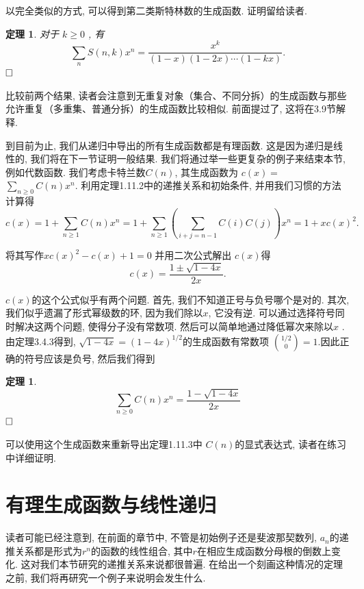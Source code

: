 \documentclass[a4paper,12pt]{ctexbook}
\newtheorem{theorem}[lemma]{\hspace{2em}定理}%
\begin{document}
以完全类似的方式, 可以得到第二类斯特林数的生成函数. 证明留给读者.
\begin{theorem}
对于 $k \geq 0$ , 有
$$
\sum_{n} S(n, k) x^{n}=\frac{x^{k}}{(1-x)(1-2 x) \cdots(1-k x)}.
$$ $\hfill\square$
\end{theorem}

比较前两个结果, 读者会注意到无重复对象（集合、不同分拆）的生成函数与那些允许重复（多重集、普通分拆）的生成函数比较相似. 前面提过了, 这将在3.9节解释.

到目前为止, 我们从递归中导出的所有生成函数都是有理函数. 这是因为递归是线性的, 我们将在下一节证明一般结果. 我们将通过举一些更复杂的例子来结束本节, 例如代数函数. 我们考虑卡特兰数$C(n)$, 其生成函数为 $c(x)=$ $\sum_{n \geq 0} C(n) x^{n}$. 利用定理1.11.2中的递推关系和初始条件, 并用我们习惯的方法计算得
$$
c(x)=1+\sum_{n \geq 1} C(n) x^{n}=1+\sum_{n \geq 1}\left(\sum_{i+j=n-1} C(i) C(j)\right) x^{n}=1+x c(x)^{2} .
$$

将其写作$x c(x)^{2}-c(x)+1=0$ 并用二次公式解出 $c(x)$得
$$
c(x)=\frac{1 \pm \sqrt{1-4 x}}{2 x} .
$$

$c(x)$的这个公式似乎有两个问题. 首先, 我们不知道正号与负号哪个是对的. 其次, 我们似乎遗漏了形式幂级数的环, 因为我们除以$x$, 它没有逆. 可以通过选择符号同时解决这两个问题, 使得分子没有常数项. 然后可以简单地通过降低幂次来除以$x$ . 由定理3.4.3得到,  $\sqrt{1-4 x}=(1-4 x)^{1 / 2}$的生成函数有常数项  $\binom{1/2}{0}=1$.因此正确的符号应该是负号, 然后我们得到
\begin{theorem}
	$$
	\sum_{n \geq 0} C(n) x^{n}=\frac{1-\sqrt{1-4 x}}{2 x}
	$$ $\hfill\square$
\end{theorem}

可以使用这个生成函数来重新导出定理1.11.3中 $C(n)$的显式表达式, 读者在练习中详细证明.
\section{有理生成函数与线性递归}
读者可能已经注意到, 在前面的章节中, 不管是初始例子还是斐波那契数列, $a_{n}$的递推关系都是形式为$r^{n}$的函数的线性组合, 其中$r$在相应生成函数分母根的倒数上变化. 这对我们本节研究的递推关系来说都很普遍. 在给出一个刻画这种情况的定理之前, 我们将再研究一个例子来说明会发生什么.
\end{document}
